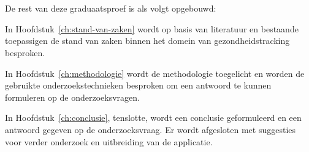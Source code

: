 \section{}%
\label{sec:opzet-graduaatsproef}


De rest van deze graduaatsproef is als volgt opgebouwd:

In Hoofdstuk~\ref{ch:stand-van-zaken} wordt op basis van literatuur en bestaande toepassigen de stand van zaken binnen het domein van gezondheidstracking besproken. 

In Hoofdstuk~\ref{ch:methodologie} wordt de methodologie toegelicht en worden de gebruikte onderzoekstechnieken besproken om een antwoord te kunnen formuleren op de onderzoeksvragen.


In Hoofdstuk~\ref{ch:conclusie}, tenslotte, wordt een conclusie geformuleerd en een antwoord gegeven op de onderzoeksvraag. Er wordt afgesloten met suggesties voor verder onderzoek en uitbreiding van de applicatie. 